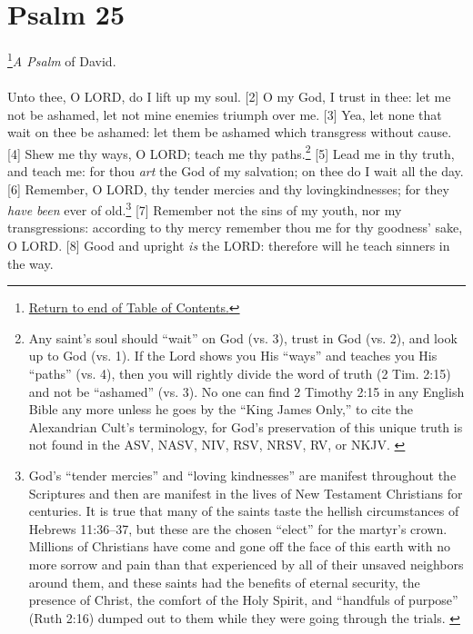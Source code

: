 \chapter{Psalm 25}
\footnote{\textcolor[rgb]{0.00,0.25,0.00}{\hyperlink{TOC}{Return to end of Table of Contents.}}}\textcolor[cmyk]{0.99998,1,0,0}{\emph{A Psalm} of David.}\\
\\
\textcolor[cmyk]{0.99998,1,0,0}{Unto thee, O LORD, do I lift up my soul.}
[2] \textcolor[cmyk]{0.99998,1,0,0}{O my God, I trust in thee: let me not be ashamed, let not mine enemies triumph over me.}
[3] \textcolor[cmyk]{0.99998,1,0,0}{Yea, let none that wait on thee be ashamed: let them be ashamed which transgress without cause.}
[4] \textcolor[cmyk]{0.99998,1,0,0}{Shew me thy ways, O LORD; teach me thy paths.}\footnote{Any saint’s soul should “wait” on God (vs. 3), trust in God (vs. 2), and look up to God (vs. 1). If the Lord shows you His “ways” and teaches you His “paths” (vs. 4), then you will rightly divide the word of truth (2 Tim. 2:15) and not be “ashamed” (vs. 3). No one can find 2 Timothy 2:15 in any English Bible any more unless he goes by the “King James Only,” to cite the Alexandrian Cult’s terminology, for God’s preservation of this unique truth is not found in the ASV, NASV, NIV, RSV, NRSV, RV, or NKJV. \cite{Ruckman1992Psalms}}
[5] \textcolor[cmyk]{0.99998,1,0,0}{Lead me in thy truth, and teach me: for thou \emph{art} the God of my salvation; on thee do I wait all the day.}
[6] \textcolor[cmyk]{0.99998,1,0,0}{Remember, O LORD, thy tender mercies and thy lovingkindnesses; for they \emph{have} \emph{been} ever of old.}\footnote{God’s “tender mercies” and “loving kindnesses” are manifest throughout the Scriptures and then are manifest in the lives of New Testament Christians for centuries. It is true that many of the saints taste the hellish circumstances of Hebrews 11:36--37, but these are the chosen “elect” for the martyr’s crown. Millions of Christians have come and gone off the face of this earth with no more sorrow and pain than that experienced by all of their unsaved neighbors around them, and these saints had the benefits of eternal security, the presence of Christ, the comfort of the Holy Spirit, and ``handfuls of purpose'' (Ruth 2:16) dumped out to them while they were going through the trials. \cite{Ruckman1992Psalms}}
[7] \textcolor[cmyk]{0.99998,1,0,0}{Remember not the sins of my youth, nor my transgressions: according to thy mercy remember thou me for thy goodness' sake, O LORD.}
[8] \textcolor[cmyk]{0.99998,1,0,0}{Good and upright \emph{is} the LORD: therefore will he teach sinners in the way.}
